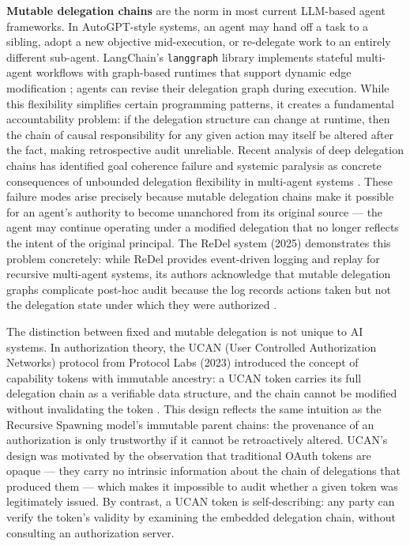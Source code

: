 \textbf{Mutable delegation chains} are the norm in most current LLM-based agent frameworks. In AutoGPT-style systems, an agent may hand off a task to a sibling, adopt a new objective mid-execution, or re-delegate work to an entirely different sub-agent. LangChain's \texttt{langgraph} library implements stateful multi-agent workflows with graph-based runtimes that support dynamic edge modification \cite{heavybit2025multiagent}; agents can revise their delegation graph during execution. While this flexibility simplifies certain programming patterns, it creates a fundamental accountability problem: if the delegation structure can change at runtime, then the chain of causal responsibility for any given action may itself be altered after the fact, making retrospective audit unreliable. Recent analysis of deep delegation chains has identified goal coherence failure and systemic paralysis as concrete consequences of unbounded delegation flexibility in multi-agent systems \cite{multi_agent_coordination_failures}. These failure modes arise precisely because mutable delegation chains make it possible for an agent's authority to become unanchored from its original source — the agent may continue operating under a modified delegation that no longer reflects the intent of the original principal. The ReDel system (2025) demonstrates this problem concretely: while ReDel provides event-driven logging and replay for recursive multi-agent systems, its authors acknowledge that mutable delegation graphs complicate post-hoc audit because the log records actions taken but not the delegation state under which they were authorized \cite{redel2025arxiv}.

The distinction between fixed and mutable delegation is not unique to AI systems. In authorization theory, the UCAN (User Controlled Authorization Networks) protocol from Protocol Labs (2023) introduced the concept of capability tokens with immutable ancestry: a UCAN token carries its full delegation chain as a verifiable data structure, and the chain cannot be modified without invalidating the token \cite{UCAN}. This design reflects the same intuition as the Recursive Spawning model's immutable parent chains: the provenance of an authorization is only trustworthy if it cannot be retroactively altered. UCAN's design was motivated by the observation that traditional OAuth tokens are opaque — they carry no intrinsic information about the chain of delegations that produced them — which makes it impossible to audit whether a given token was legitimately issued. By contrast, a UCAN token is self-describing: any party can verify the token's validity by examining the embedded delegation chain, without consulting an authorization server.

